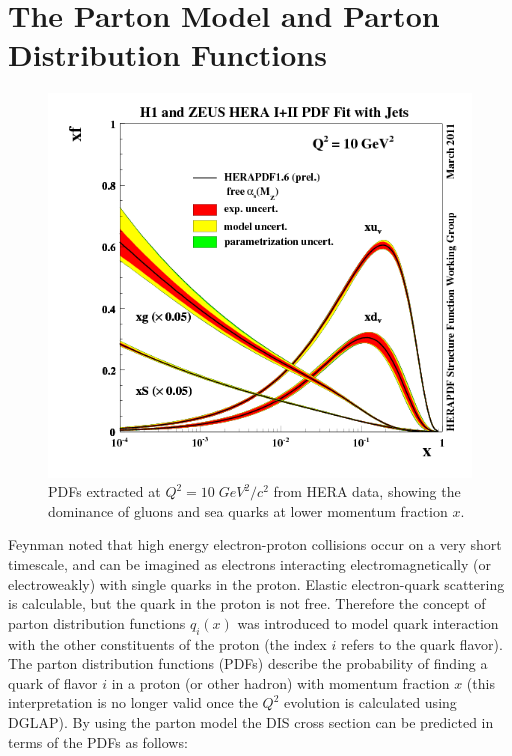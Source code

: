 \section{The Parton Model and Parton Distribution Functions}

\begin{figure}
	\centering
	\includegraphics[width = \textwidth]{image/plots/introduction/pdf.png}	
	\caption[A recent PDF extraction from HERA data.]{PDFs extracted at $Q^2 = 10 \; GeV^2/c^2$ from HERA data, showing the dominance of gluons and sea quarks at lower momentum fraction $x$.}
	\label{fig:pdfs}
\end{figure}

Feynman noted that high energy electron-proton collisions occur on a very short timescale, and can be imagined as electrons interacting electromagnetically (or electroweakly) with single quarks in the proton.  Elastic electron-quark scattering is calculable, but the quark in the proton is not free.  Therefore the concept of parton distribution functions $q_i(x)$ was introduced to model quark interaction with the other constituents of the proton (the index $i$ refers to the quark flavor).  The parton distribution functions (PDFs) describe the probability of finding a quark of flavor $i$ in a proton (or other hadron) with momentum fraction $x$ (this interpretation is no longer valid once the $Q^2$ evolution is calculated using DGLAP).  By using the parton model the DIS cross section can be predicted in terms of the PDFs as follows:    


